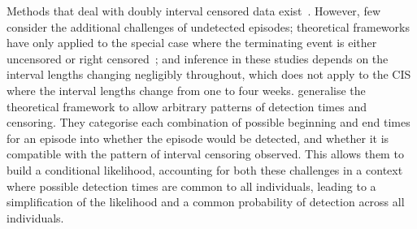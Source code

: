 \documentclass[12pt]{article}
\newcommand\citePersonalComms[1]{(#1, personal communication)}
\begin{document}

Methods that deal with doubly interval censored data exist~\citep{sunStatistical,bogaertsSurvival}.
However, few consider the additional challenges of undetected episodes;
theoretical frameworks~\citep{turnbullEmpirical,dempsterMaximum} have only applied to the special case where the terminating event is either uncensored or right censored~\citep[e.g.][]{sunEmpirical,bacchettiNonparametric,shenNonparametric}; and
inference in these studies depends on the interval lengths changing negligibly throughout, which does not apply to the CIS where the interval lengths change from one to four weeks. %
\citet{heiseyModelling} generalise the theoretical framework to allow arbitrary patterns of detection times and censoring.
They categorise each combination of possible beginning and end times for an episode into whether the episode would be detected, and whether it is compatible with the pattern of interval censoring observed.
This allows them to build a conditional likelihood, accounting for both these challenges in a context where possible detection times are common to all individuals, leading to a simplification of the likelihood and a common probability of detection across all individuals.
\end{document}
